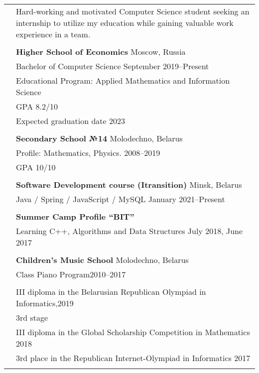 \documentclass[letterpaper, 11pt]{article}
\begin{document}
\begin{longtable}{p{1.3in}p{4.8in}}


\nohyphens{\color{OliveGreen}{Objective}}
& Hard-working and motivated Computer Science student seeking an internship to utilize my
education while gaining valuable work experience in a team. \\
& \\


\color{OliveGreen}{Education} 
& \textbf{Higher School of Economics} \hfill Moscow, Russia \\ 
& Bachelor of Computer Science \hfill September 2019--Present \\
& Educational Program: Applied Mathematics and Information Science\\
& GPA 8.2/10 \\
& Expected graduation date 2023 \\
& \\

& \textbf{Secondary School №14} \hfill Molodechno, Belarus \\
& Profile: Mathematics, Physics. \hfill 2008--2019\\
& GPA 10/10 \\
& \\



{\color{OliveGreen}{Additional}}
& \textbf{Software Development course (Itransition)} \hfill Minsk, Belarus\\
{\color{OliveGreen}{Education}} 
& Java / Spring / JavaScript / MySQL \hfill January 2021--Present\\
& \\

& \textbf{Summer Camp Profile “BIT”} \\
& Learning C++, Algorithms and Data Structures \hfill July 2018, June 2017 \\
& \\

& \textbf{Children’s Music School} \hfill Molodechno, Belarus\\
& Class Piano Program\hfill 2010--2017\\
& \\


{\color{OliveGreen}{Aware and}} 
& III diploma in the Belarusian Republican Olympiad in Informatics,\hfill 2019\\
{\color{OliveGreen}{achievements}} 
& 3rd stage \\
& III diploma in the Global Scholarship Competition in Mathematics \hfill 2018\\
& 3rd place in the Republican Internet-Olympiad in Informatics  \hfill 2017\\
& \\


\end{longtable}
\end{document}
